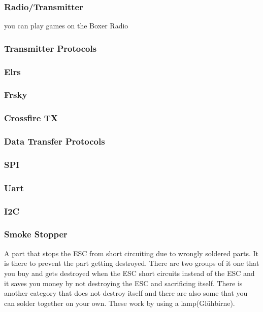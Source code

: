 \documentclass{article}
\begin{document}
	\subsubsection{Radio/Transmitter}
	
	you can play games on the Boxer Radio
	\subsubsection{Transmitter Protocols}
	\subsubsection*{Elrs}
	\subsubsection*{Frsky}
	\subsubsection*{Crossfire TX}
	
	\subsubsection{Data Transfer Protocols}
	\subsubsection*{SPI}
	\subsubsection*{Uart}
	\subsubsection*{I2C}
	
	\subsubsection{Smoke Stopper}
	A part that stops the ESC from short circuiting due to wrongly soldered parts. It is there to prevent the part getting destroyed. There are two groups of it one that you buy and gets destroyed when the ESC short circuits instead of the ESC and it saves you money by not destroying the ESC and sacrificing itself. There is another category that does not destroy itself and there are also some that you can solder together on your own. These work by using a lamp(Glühbirne).
	
	
	
\end{document}
